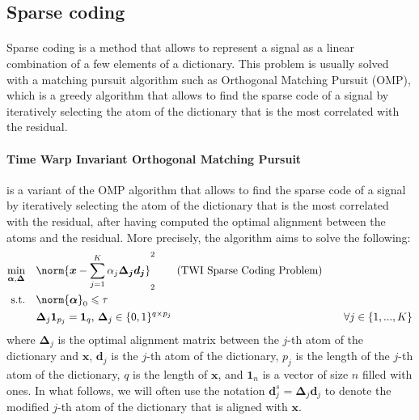 \documentclass[11pt]{article}
\begin{document}
\subsection{Sparse coding}

\paragraph{} Sparse coding is a method that allows to represent a signal as a linear combination of a few elements of a dictionary. This problem is usually solved with a matching pursuit \cite{matching_pursuit} algorithm such as Orthogonal Matching Pursuit \cite{orthogonal_matching_pursuit} (OMP), which is a greedy algorithm that allows to find the sparse code of a signal by iteratively selecting the atom of the dictionary that is the most correlated with the residual.

\paragraph{Time Warp Invariant Orthogonal Matching Pursuit} is a variant of the OMP algorithm \cite{orthogonal_matching_pursuit} that allows to find the sparse code of a signal by iteratively selecting the atom of the dictionary that is the most correlated with the residual, after having computed the optimal alignment between the atoms and the residual. More precisely, the algorithm aims to solve the following:
\begin{alignat*}{4}
    \min_{\bm{\alpha}, \bm{\Delta}} &\quad \norm{\bm{x} - \sum \limits_{j=1}^K \alpha_j \bm{\Delta_j} \bm{d_j}}_2^2 \tag{TWI Sparse Coding Problem} \\ 
    \text{s.t.} &\quad \norm{\bm{\alpha}}_0 \leqslant \tau \\
    &\quad  \bm{\Delta}_j \bm{1}_{p_j} = \bm{1}_q \text{, } \bm{\Delta}_j \in \{ 0, 1 \}^{q \times p_j} &\quad \forall j \in \{1, ..., K\}
\end{alignat*}
where $\bm{\Delta}_j$ is the optimal alignment matrix between the $j$-th atom of the dictionary and $\bm{x}$, $\bm{d}_j$ is the $j$-th atom of the dictionary, $p_j$ is the length of the $j$-th atom of the dictionary, $q$ is the length of $\bm{x}$, and $\bm{1}_n$ is a vector of size $n$ filled with ones. In what follows, we will often use the notation $\bm{d}_j^s = \bm{\Delta}_j \bm{d}_j$ to denote the modified $j$-th atom of the dictionary that is aligned with $\bm{x}$.
\end{document}
